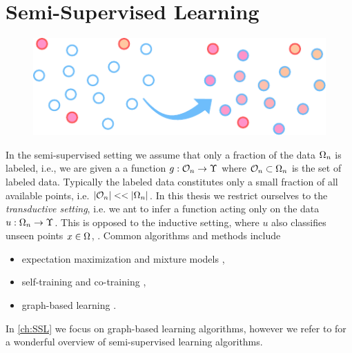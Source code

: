 \section{Semi-Supervised Learning}\label{sec:PSSL}
\begin{figure}
\centering
\includegraphics[width=.5\textwidth]{atelier/paradigms/SSL.pdf}
\end{figure}
%
In the semi-supervised setting we assume that only a fraction of the data $\Omega_n$ is labeled, i.e., we are given a a function $g:\mathcal{O}_n\to\Upsilon$ where $\mathcal{O}_n\subset\Omega_n$ is the set of labeled data. Typically the labeled data constitutes only a small fraction of all available points, i.e. $\left|\mathcal{O}_n\right|<<\left|\Omega_n\right|$. In this thesis we restrict ourselves to the \emph{transductive setting}, i.e. we ant to infer a function acting only on the data $u: \Omega_n\to \Upsilon$. This is opposed to the inductive setting, where $u$ also classifies unseen points $x\in\Omega$, \cite{zhu2005semi}. Common algorithms and methods include
%
\begin{itemize}
\item expectation maximization and mixture models \cite{??},
\item self-training and co-training \cite{??},
\item graph-based learning \cite{zhu2005semi}.
\end{itemize}
%
%
In \cref{ch:SSL} we focus on graph-based learning algorithms, however we refer to \cite{zhu2005semi} for a wonderful overview of semi-supervised learning algorithms.